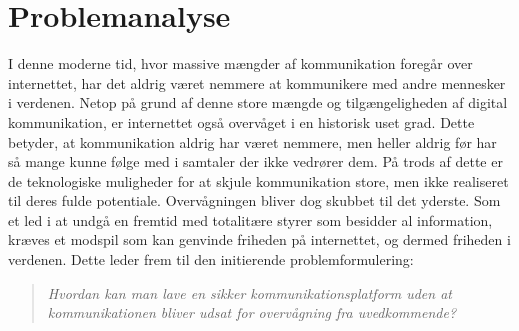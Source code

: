 \section{Problemanalyse}
I denne moderne tid, hvor massive mængder af kommunikation foregår over internettet, har det aldrig været nemmere at kommunikere med andre mennesker i verdenen. Netop på grund af denne store mængde og tilgængeligheden af digital kommunikation, er internettet også overvåget i en historisk uset grad. Dette betyder, at kommunikation aldrig har været nemmere, men heller aldrig før har så mange kunne følge med i samtaler der ikke vedrører dem. På trods af dette er de teknologiske muligheder for at skjule kommunikation store, men ikke realiseret til deres fulde potentiale. Overvågningen bliver dog skubbet til det yderste. Som et led i at undgå en fremtid med totalitære styrer som besidder al information, kræves et modspil som kan genvinde friheden på internettet, og dermed friheden i verdenen. Dette leder frem til den initierende problemformulering:

\begin{quote}
    \textit{Hvordan kan man lave en sikker kommunikationsplatform uden at kommunikationen bliver udsat for overvågning fra uvedkommende?}
\end{quote}

\newpage



\newpage